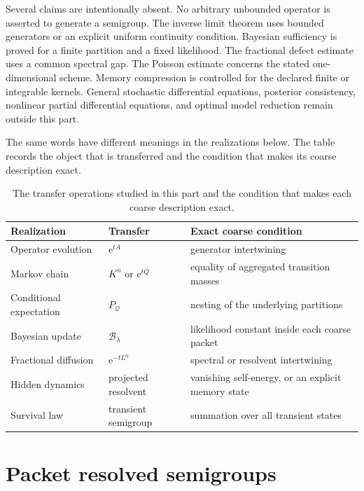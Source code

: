 \documentclass[11pt,letterpaper]{article}
\theoremstyle{plain}
\theoremstyle{plain}
\theoremstyle{plain}
\theoremstyle{definition}
\theoremstyle{definition}
\theoremstyle{definition}
\theoremstyle{definition}
\theoremstyle{definition}
\theoremstyle{remark}
\theoremstyle{remark}
\theoremstyle{remark}
\theoremstyle{remark}
\theoremstyle{remark}
\theoremstyle{remark}
\newcommand{\Bcal}{\mathcal B}
\newcommand{\e}{\mathrm e}
\let\KomorebiPrimitiveMathcal\mathcal
\renewcommand{\mathcal}[1]{{\KomorebiPrimitiveMathcal{#1}}}
\let\KomorebiPrimitivemathrm\mathrm
\renewcommand{\mathrm}[1]{{\KomorebiPrimitivemathrm{#1}}}
\begin{document}
Several claims are intentionally absent. No arbitrary unbounded operator is asserted to generate a semigroup. The inverse limit theorem uses bounded generators or an explicit uniform continuity condition. Bayesian sufficiency is proved for a finite partition and a fixed likelihood. The fractional defect estimate uses a common spectral gap. The Poisson estimate concerns the stated one-dimensional scheme. Memory compression is controlled for the declared finite or integrable kernels. General stochastic differential equations, posterior consistency, nonlinear partial differential equations, and optimal model reduction remain outside this part.

The same words have different meanings in the realizations below. The table records the object that is transferred and the condition that makes its coarse description exact.

\begin{table}[t]
\centering
\small
\begin{tabular}{>{\raggedright\arraybackslash}p{}>{\raggedright\arraybackslash}p{}>{\raggedright\arraybackslash}p{}}
\toprule
Realization & Transfer & Exact coarse condition \\
\midrule
Operator evolution & $\e^{tA}$ & generator intertwining \\
Markov chain & $K^n$ or $\e^{tQ}$ & equality of aggregated transition masses \\
Conditional expectation & $P_{\mathcal Q}$ & nesting of the underlying partitions \\
Bayesian update & $\Bcal_\lambda$ & likelihood constant inside each coarse packet \\
Fractional diffusion & $\e^{-tL^\alpha}$ & spectral or resolvent intertwining \\
Hidden dynamics & projected resolvent & vanishing self-energy, or an explicit memory state \\
Survival law & transient semigroup & summation over all transient states \\
\bottomrule
\end{tabular}
\caption{The transfer operations studied in this part and the condition that makes each coarse description exact.}
\label{extended:tab:transfer_dictionary}
\end{table}

\FloatBarrier
\section{Packet resolved semigroups}\label{extended:section:02}\label{extended:sec:packet_semigroups}
\end{document}
